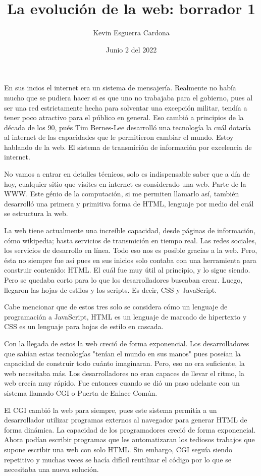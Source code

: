 \documentclass[12pt, letterpaper]{article}
\title{La evolución de la web: borrador 1}
\author{Kevin  Esguerra Cardona}
\date{Junio 2 del 2022}
\begin{document}
\maketitle

En sus incios el internet era un sistema de mensajería. Realmente no había mucho que se pudiera hacer si es que uno no trabajaba para el
gobierno, pues al ser una red estrictamente hecha para solventar una excepción militar, tendía a tener poco atractivo para el público en
general. Eso cambió a principios de la década de los 90, pués Tim Bernes-Lee desarrolló una tecnología la cuál dotaría al internet de las
capacidades que le permitieron cambiar el mundo. Estoy hablando de la web. El sistema de transmición de información por excelencia de 
internet. 

No vamos a entrar en detalles técnicos, solo es indispensable saber que a día de hoy, cualquier sitio que visites en internet es considerado
una web. Parte de la WWW. Este génio de la computación, si me permiten llamarlo así, también desarrolló una primera y primitiva forma de HTML,
lenguaje por medio del cuál se estructura la web.

La web tiene actualmente una increíble capacidad, desde páginas de información, cómo wikipedia; hasta servicios de transmición en tiempo real.
Las redes sociales, los servicios de desarrollo en línea. Todo eso nos es posible gracias a la web. Pero, ésta no siempre fue así pues en sus
inicios solo contaba con una herramienta para construir contenido: HTML. El cuál fue muy útil al principio, y lo sigue siendo. Pero se quedaba
corto para lo que los desarrolladores buscaban crear. Luego, llegaron las hojas de estilos y los scripts. Es decir, CSS y JavaScript. 

Cabe mencionar que de estos tres solo se considera cómo un lenguaje de programación a JavaScript, HTML es un lenguaje de marcado de hipertexto y
CSS es un lenguaje para hojas de estilo en cascada. 

Con la llegada de estos la web creció de forma exponencial. Los desarrolladores que sabían estas tecnologías "tenían el mundo en sus manos" pues
poseían la capacidad de construir todo cuánto imaginaran. Pero, eso no era suficiente, la web necesitaba más. Los desarrolladores no eran capaces
de llevar el ritmo, la web crecía muy rápido. Fue entonces cuando se dió un paso adelante con un sistema llamado CGI o Puerta de Enlace Común.

El CGI cambió la web para siempre, pues este sistema permitía a un desarrollador utilizar programas externos al navegador para generar HTML de 
forma dinámica. La capacidad  de los programadores creció de forma exponencial. Ahora podían escribir programas que les automatizaran los tediosos
trabajos que supone escribir una web con solo HTML. Sin embargo, CGI seguía siendo repetitivo y muchas veces se hacía difícil reutilizar el código
por lo que se necesitaba una nueva solución. 
\end{document}
